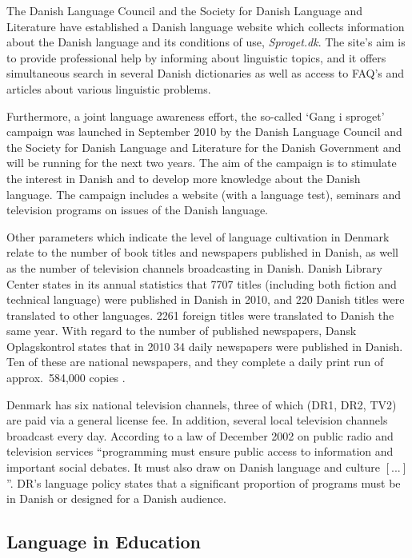 \begin{multicols}{2}
The Danish Language Council and the Society for Danish Language and Literature have established a Danish language website which collects information about the Danish language and its conditions of use, {\it Sproget.dk}. The site's aim is to provide professional help by informing about linguistic topics, and it offers simultaneous search in several Danish dictionaries as well as access to FAQ's and articles about various linguistic problems. 

Furthermore, a joint language awareness effort, the so-called `Gang i sproget' campaign was launched in September 2010 by the Danish Language Council and the Society for Danish Language and Literature for the Danish Government and will be running for the next two years. The aim of the campaign is to stimulate the interest in Danish and to develop more knowledge about the Danish language. The campaign includes a website (with a language test), seminars and television programs on issues of the Danish language. 

Other parameters which indicate the level of language cultivation in Denmark relate to the number of book titles and newspapers published in Danish, as well as the number of television channels broadcasting in Danish. Danish Library Center states in its annual statistics that 7707 titles (including both fiction and technical language) were published in Danish in 2010, and 220 Danish titles were translated to other languages. 2261 foreign titles were translated to Danish the same year. With regard to the number of published newspapers, Dansk Oplagskontrol states that in 2010 34 daily newspapers were published in Danish. Ten of these are national newspapers, and they complete a daily print run of approx.\ 584,000 copies \cite{ddo}. 

Denmark has six national television channels, three of which (DR1, DR2, TV2) are paid via a general license fee. In addition, several local television channels broadcast every day. According to a law of December 2002 on public radio and television services ``programming must ensure public access to information and important social debates. It must also draw on Danish language and culture $[...]$''. DR's language policy states that a significant proportion of programs must be in Danish or designed for a Danish audience. 


\subsection{Language in Education}


\end{multicols}
